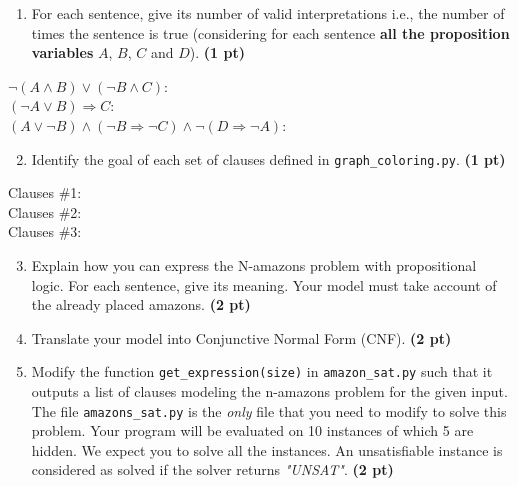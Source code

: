\documentclass[11pt,a4paper]{report}
\begin{document}
\begin{enumerate}
	\item For each sentence, give its number of valid interpretations i.e., the number of times the sentence is true 
	(considering for each sentence {\bf all the proposition variables} $A$, $B$, $C$ and $D$). \textbf{(1 pt)}
\end{enumerate}

\begin{answers}[4cm]
	$\neg ( A \land B) \lor (\neg B \land C)$: \\
	$(\neg A \lor B) \Rightarrow C $: \\
	$( A \lor \neg B) \land (\neg B \Rightarrow \neg C) \land \neg (D \Rightarrow \neg A)$: 
\end{answers}

\newpage
\begin{enumerate}
	\setcounter{enumi}{1}
	\item Identify the goal of each set of clauses defined in \texttt{graph\_coloring.py}. \textbf{(1 pt)}
\end{enumerate}

\begin{answers}[4cm]
	Clauses \#1: \\
	Clauses \#2: \\
	Clauses \#3: \\
\end{answers}

\begin{enumerate}
	\setcounter{enumi}{2}
	\item Explain how you can express the N-amazons problem with propositional logic. For each sentence, give its meaning.
	Your model must take account of the already placed amazons. \textbf{(2 pt)}
\end{enumerate}

\begin{answers}[10cm]

\end{answers}
\newpage

\begin{enumerate}
	\setcounter{enumi}{3}
	\item Translate your model into Conjunctive Normal Form (CNF). \textbf{(2 pt)}
\end{enumerate}

\begin{answers}[10cm]

\end{answers}

\begin{enumerate}
	\setcounter{enumi}{4}
	\item Modify the function {\tt get\_expression(size)} in \texttt{amazon\_sat.py} such that it outputs a list
	of clauses modeling the n-amazons problem for the given input.
	The file \texttt{amazons\_sat.py} is the \emph{only} file that you need to modify to solve this problem. 
	Your program will be evaluated on 10 instances of which 5 are hidden. We expect you to solve all the instances.
	An unsatisfiable instance is considered as solved if the solver returns \textit{"UNSAT"}. \textbf{(2 pt)}
\end{enumerate}
\end{document}
